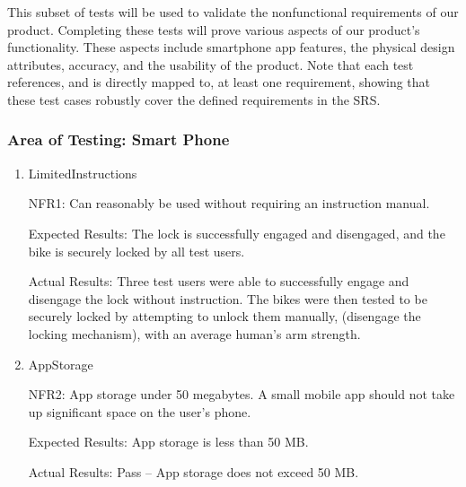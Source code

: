 \documentclass[12pt, titlepage]{article}
\begin{document}
This subset of tests will be used to validate the nonfunctional requirements of our product. Completing these tests will prove various aspects of our product's functionality. These aspects include smartphone app features, the physical design attributes, accuracy, and the usability of the product. Note that each test references, and is directly mapped to, at least one requirement, showing that these test cases robustly cover the defined requirements in the SRS.

\subsubsection{Area of Testing: Smart Phone}

\begin{enumerate}

\item{LimitedInstructions

NFR1: Can reasonably be used without requiring an instruction manual. }

Expected Results: The lock is successfully engaged and disengaged, and the bike is securely locked by all test users.

Actual Results: Three test users were able to successfully engage and disengage the lock without instruction. The bikes were then tested to be securely locked by attempting to unlock them manually, (disengage the locking mechanism), with an average human's arm strength. 

\item{AppStorage

NFR2: App storage under 50 megabytes. A small mobile app should not take up significant space on the user’s phone.  }

Expected Results: App storage is less than 50 MB. 

Actual Results: Pass -- App storage does not exceed 50 MB. 

\end{enumerate}
\end{document}
